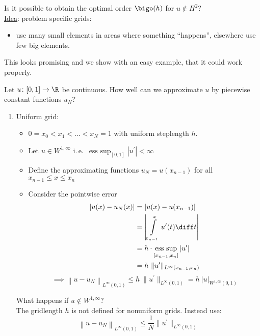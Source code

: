 Is it possible to obtain the optimal order $\bigo(h)$ for $u \not \in H^2$?\\
\underline{Idea}: problem specific grids:
\begin{itemize}
  \item use many small elements in areas where something \enquote{happens}, elsewhere use few big elements.
\end{itemize}
This looks promising and we show with an easy example, that it could work properly.
\begin{example}
	Let $u\colon [0,1] \to \R$ be continuous. How well can we approximate $u$ by piecewise constant functions $u_{N}$?
	\begin{enumerate}[label = \Roman*)]
    \item Uniform grid: \label{ex:uniformgrid}
			\begin{itemize}
				\item $0 = x_{0} < x_{1}< \dots < x_{N} = 1$ with uniform steplength $h$.
        \item Let $u \in W^{1,\infty}$ i.\,e.\ $\operatorname*{ess~sup}_{[0,1]} | u^\prime|< \infty$
				\item Define the approximating functions $u_{N}=u(x_{n-1})$ for all $x_{n-1}\leq x \leq x_{n}$
				\item Consider the pointwise error
					\begin{align*}
            |u(x) - u_{N}(x)| &= |u(x) - u(x_{n-1})|\\
                                  &= \left|\int\limits_{x_{n-1}}^{x} u^\prime(t) \diff t\right|\\
                                  &= h\cdot \operatorname*{ess~sup}_{[x_{n-1},x_{n}]}|u^\prime| \\
                                  &= h\ \|u^\prime\|_{L^\infty(x_{n-1},x_{n})}
					\end{align*}
					\begin{equation*}
            \implies \left\|u -u_{N}\right\|_{L^\infty(0,1)} \leq h \ \|u^\prime\|_{L^\infty(0,1)}= h \ |u|_{W^{1,\infty}(0,1)}
				\end{equation*}
			\end{itemize}
			What happens if $u \not \in W^{1,\infty}$?\\
			The gridlength $h$ is not defined for nonuniform grids. Instead use:
			\begin{equation*}
        \left\|u-u_{N}\right\|_{L^{\infty}(0,1)}  \leq \frac{1}{N} \|u^\prime\|_{L^\infty(0,1)}
			\end{equation*}

\end{enumerate}
\end{example}
